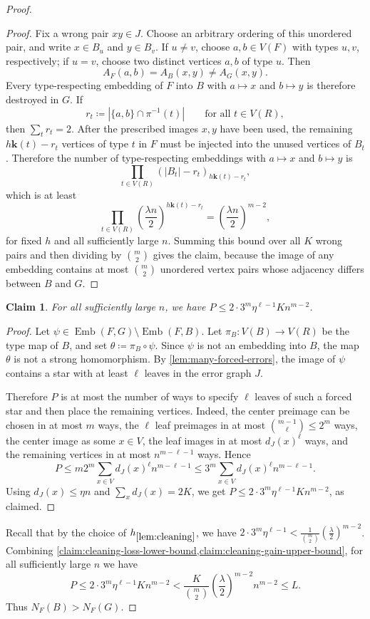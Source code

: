 \documentclass[10pt]{article}
\theoremstyle{plain}
\newtheorem{claim}[claim]{Claim}
\theoremstyle{remark}
\DeclareMathOperator{\Emb}{Emb}
\begin{document}
\begin{proof}
\begin{proof}
Fix a wrong pair $xy\in J$. Choose an arbitrary ordering of this unordered pair, and write $x\in B_u$ and $y\in B_v$. If $u\ne v$, choose $a,b\in V(F)$ with types $u,v$, respectively; if $u=v$, choose two distinct vertices $a,b$ of type $u$. Then
\[
        A_F(a,b)=A_B(x,y)\ne A_G(x,y).
\]
Every type-respecting embedding of $F$ into $B$ with $a\mapsto x$ and $b\mapsto y$ is therefore destroyed in $G$. If
\[
        r_t\coloneqq |\{a,b\}\cap \pi^{-1}(t)|\qquad\text{for all }t\in V(R),
\]
then $\sum_t r_t=2$. After the prescribed images $x,y$ have been used, the remaining $h\mathbf k(t)-r_t$ vertices of type $t$ in $F$ must be injected into the unused vertices of $B_t$. Therefore the number of type-respecting embeddings with $a\mapsto x$ and $b\mapsto y$ is
\[
        \prod_{t\in V(R)} (|B_t|-r_t)_{h\mathbf k(t)-r_t},
\]
which is at least
\[
        \prod_{t\in V(R)}\left(\frac{\lambda n}{2}\right)^{h\mathbf k(t)-r_t}
        = \left(\frac{\lambda n}{2}\right)^{m-2},
\]
for fixed $h$ and all sufficiently large $n$. Summing this bound over all $K$ wrong pairs and then dividing by $\binom m2$ gives the claim, because the image of any embedding contains at most $\binom m2$ unordered vertex pairs whose adjacency differs between $B$ and $G$.
\end{proof}

\begin{claim}
\label{claim:cleaning-gain-upper-bound}
For all sufficiently large $n$, we have $P\le 2\cdot 3^m\eta^{\ell-1}K n^{m-2}$.
\end{claim}

\begin{proof}
Let $\psi\in\Emb(F,G)\setminus\Emb(F,B)$. Let $\pi_B:V(B)\to V(R)$ be the type map of $B$, and set $\theta\coloneqq\pi_B\circ\psi$. Since $\psi$ is not an embedding into $B$, the map $\theta$ is not a strong homomorphism. By \cref{lem:many-forced-errors}, the image of $\psi$ contains a star with at least $\ell$ leaves in the error graph $J$.

Therefore $P$ is at most the number of ways to specify $\ell$ leaves of such a forced star and then place the remaining vertices. Indeed, the center preimage can be chosen in at most $m$ ways, the $\ell$ leaf preimages in at most $\binom{m-1}{\ell}\le2^m$ ways, the center image as some $x\in V$, the leaf images in at most $d_J(x)^\ell$ ways, and the remaining vertices in at most $n^{m-\ell-1}$ ways. Hence
\[
        P\le m2^m\sum_{x\in V} d_J(x)^\ell n^{m-\ell-1}
        \le 3^m\sum_{x\in V} d_J(x)^\ell n^{m-\ell-1}.
\]
Using $d_J(x)\le\eta n$ and $\sum_xd_J(x)=2K$, we get $P\le 2\cdot 3^m\eta^{\ell-1}K n^{m-2}$, as claimed.
\end{proof}

Recall that by the choice of $h_{\ref{lem:cleaning}}$, we have $2\cdot 3^m\eta^{\ell-1} < \frac{1}{\binom m2}\left(\frac{\lambda}{2}\right)^{m-2}$.
Combining \cref{claim:cleaning-loss-lower-bound,claim:cleaning-gain-upper-bound}, for all sufficiently large $n$ we have
\[
        P\le 2\cdot 3^m\eta^{\ell-1}K n^{m-2}
        < \frac{K}{\binom m2}\left(\frac{\lambda}{2}\right)^{m-2}n^{m-2}
        \le L.
\]
Thus $N_F(B)>N_F(G)$.
\end{proof}
\end{document}
